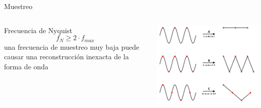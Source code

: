 \documentclass[aspectratio=169]{beamer}
\begin{document}
\begin{frame}{Muestreo}
    \begin{columns}
    \begin{column}{0.4\textwidth}
        \centering
        Frecuencia de Nyquist
        \begin{equation*}
            f_N \geq 2\cdot f_{max} 
        \end{equation*}
        una frecuencia de muestreo muy baja puede causar una reconstrucción inexacta de la forma de onda
    \end{column}
    \begin{column}{0.6\textwidth}
        \begin{center}
            \includegraphics[width=0.9\linewidth]{presentaciones/fig/sampling.png}  
        \end{center}
    \end{column}
    \end{columns}
\end{frame}
\end{document}
